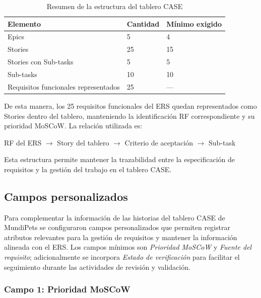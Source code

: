 \documentclass[journal,onecolumn]{IEEEtran}
\begin{document}
	\begin{table}[H]
		\centering
		\caption{Resumen de la estructura del tablero CASE}
		\label{tab:tablero-resumen}
		\begin{tabular}{L{6.5cm} C{2.6cm} C{3.4cm}}
			\toprule
			\textbf{Elemento} & \textbf{Cantidad} & \textbf{Mínimo exigido} \\
			\midrule
			Epics                                & 5  & 4 \\
			Stories                              & 25 & 15 \\
			Stories con Sub-tasks                & 5  & 5 \\
			Sub-tasks                            & 10 & 10 \\
			Requisitos funcionales representados & 25 & --- \\
			\bottomrule
		\end{tabular}
	\end{table}
	
	De esta manera, los 25 requisitos funcionales del ERS quedan representados como Stories dentro del
	tablero, manteniendo la identificación RF correspondiente y su prioridad MoSCoW. La relación
	utilizada es:
	
	\begin{center}
		RF del ERS $\rightarrow$ Story del tablero $\rightarrow$ Criterio de aceptación $\rightarrow$
		Sub-task
	\end{center}
	
	Esta estructura permite mantener la trazabilidad entre la especificación de requisitos y la
	gestión del trabajo en el tablero CASE.
	
	\subsection{Campos personalizados}
	\label{sec:campos}
	
	Para complementar la información de las historias del tablero CASE de MundiPets se configuraron
	campos personalizados que permiten registrar atributos relevantes para la gestión de requisitos y
	mantener la información alineada con el ERS. Los campos mínimos son \emph{Prioridad MoSCoW} y
	\emph{Fuente del requisito}; adicionalmente se incorpora \emph{Estado de verificación} para
	facilitar el seguimiento durante las actividades de revisión y validación.
	
	\subsubsection{Campo 1: Prioridad MoSCoW}
	
\end{document}
